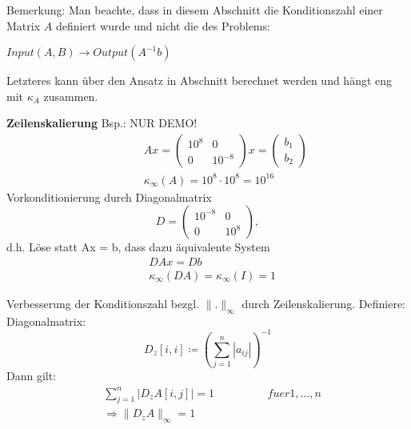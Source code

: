 Bemerkung: Man beachte, dass in diesem Abschnitt die Konditionszahl einer Matrix $A$ definiert wurde und nicht die des Problems:

$Input\left(A,B\right) \rightarrow Output\left(A^{-1}b\right)$

Letzteres kann über den Ansatz in Abschnitt  berechnet werden und hängt eng mit $\kappa_A$ zusammen.

\textbf{Zeilenskalierung}
Bsp.: NUR DEMO!
\begin{equation*}
  \begin{aligned}
    \hspace{1cm} &Ax = \begin{pmatrix} 10^8 & 0 \\ 0 & 10^{-8} \end{pmatrix} x = \begin{pmatrix}b_1 \\ b_2\end{pmatrix} \\
    &\kappa_\infty\left(A\right) = 10^8 \cdot 10^8 = 10^{16}
  \end{aligned}
\end{equation*}
Vorkonditionierung durch Diagonalmatrix
\begin{equation*}
  D = \begin{pmatrix}10^{-8} & 0 \\ 0 & 10^8\end{pmatrix},
\end{equation*}
d.h. Löse statt Ax = b, dass dazu äquivalente System
\begin{equation*}
  \begin{aligned}
    &DAx = Db \\
    &\kappa_\infty\left(DA\right) = \kappa_\infty\left(I\right) = 1
	\end{aligned}	
\end{equation*}

Verbesserung der Konditionszahl bezgl. $\|.\|_\infty$ durch Zeilenskalierung.
Definiere: Diagonalmatrix:
\begin{equation*}
  D_z \left[ i,i \right] \coloneqq \left(\sum\limits_{j=1}^{n}{\left|a_{ij}\right|}\right)^{-1} %
\end{equation*}
Dann gilt:
\begin{equation*}
  \begin{aligned}
    &\sum\limits_{j=1}^{n}{\left|D_zA\left[i,j\right]\right|} = 1  \hspace{2cm} fuer 1, ..., n \\
    &\Rightarrow \|D_zA\|_\infty = 1
		\end{aligned}
\end{equation*}

